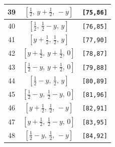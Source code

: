 \documentclass[fleqn,8pt]{jsarticle}
\begin{document}
\begin{longtable}{ccc}
39 & $\left[ \frac{1}{2},\, y + \frac{1}{2},\, - y \right]$ & {\tt [75,86]} \\ \hline
40 & $\left[ \frac{1}{2},\, \frac{1}{2} - y,\, y \right]$ & {\tt [76,85]} \\ \hline
41 & $\left[ y + \frac{1}{2},\, \frac{1}{2},\, y \right]$ & {\tt [77,90]} \\ \hline
42 & $\left[ y + \frac{1}{2},\, y + \frac{1}{2},\, 0 \right]$ & {\tt [78,87]} \\ \hline
43 & $\left[ \frac{1}{2} - y,\, y + \frac{1}{2},\, 0 \right]$ & {\tt [79,88]} \\ \hline
44 & $\left[ \frac{1}{2} - y,\, \frac{1}{2},\, y \right]$ & {\tt [80,89]} \\ \hline
45 & $\left[ \frac{1}{2} - y,\, \frac{1}{2} - y,\, 0 \right]$ & {\tt [81,96]} \\ \hline
46 & $\left[ y + \frac{1}{2},\, \frac{1}{2},\, - y \right]$ & {\tt [82,91]} \\ \hline
47 & $\left[ y + \frac{1}{2},\, \frac{1}{2} - y,\, 0 \right]$ & {\tt [83,95]} \\ \hline
48 & $\left[ \frac{1}{2} - y,\, \frac{1}{2},\, - y \right]$ & {\tt [84,92]} \\
\end{longtable}
\renewcommand{\arraystretch}{1.2}
\end{document}
